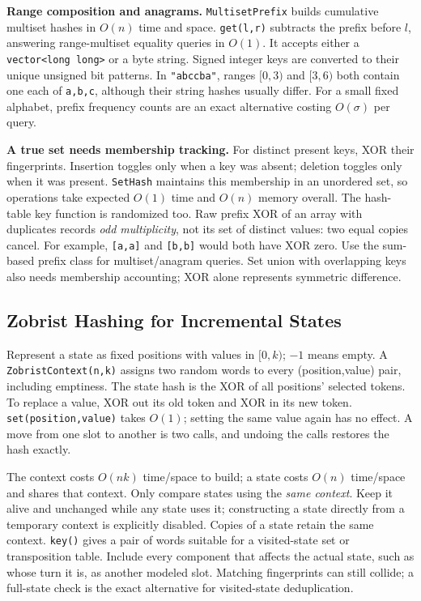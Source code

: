 \textbf{Range composition and anagrams.}
\texttt{MultisetPrefix} builds cumulative multiset hashes in $O(n)$
time and space. \texttt{get(l,r)} subtracts the prefix before $l$,
answering range-multiset equality queries in $O(1)$.
It accepts either a \texttt{vector<long long>} or a byte string.
Signed integer keys are converted to their unique unsigned bit
patterns. In \texttt{"abccba"}, ranges $[0,3)$ and $[3,6)$ both
contain one each of \texttt{a,b,c}, although their string hashes
usually differ. For a small fixed alphabet, prefix frequency counts
are an exact alternative costing $O(\sigma)$ per query.

\textbf{A true set needs membership tracking.}
For distinct present keys, XOR their fingerprints. Insertion toggles
only when a key was absent; deletion toggles only when it was present.
\texttt{SetHash} maintains this membership in an unordered set,
so operations take expected $O(1)$ time and $O(n)$ memory overall.
The hash-table key function is randomized too.
Raw prefix XOR of an array with duplicates records \emph{odd
multiplicity}, not its set of distinct values: two equal copies cancel.
For example, \texttt{[a,a]} and \texttt{[b,b]} would both have XOR
zero. Use the sum-based prefix class for multiset/anagram queries.
Set union with overlapping keys also needs membership accounting;
XOR alone represents symmetric difference.


\subsection{Zobrist Hashing for Incremental States}
Represent a state as fixed positions with values in $[0,k)$;
$-1$ means empty. A \texttt{ZobristContext(n,k)} assigns two random
words to every (position,value) pair, including emptiness.
The state hash is the XOR of all positions' selected tokens.
To replace a value, XOR out its old token and XOR in its new token.
\texttt{set(position,value)} takes $O(1)$; setting the same value
again has no effect. A move from one slot to another is two calls,
and undoing the calls restores the hash exactly.

The context costs $O(nk)$ time/space to build; a state costs $O(n)$
time/space and shares that context. Only compare states using the
\emph{same context}. Keep it alive and unchanged while any state
uses it; constructing a state directly from a temporary context is
explicitly disabled. Copies of a state retain the same context.
\texttt{key()} gives a pair of words suitable for a visited-state
set or transposition table. Include every component that affects
the actual state, such as whose turn it is, as another modeled slot.
Matching fingerprints can still collide; a full-state check is the
exact alternative for visited-state deduplication.



